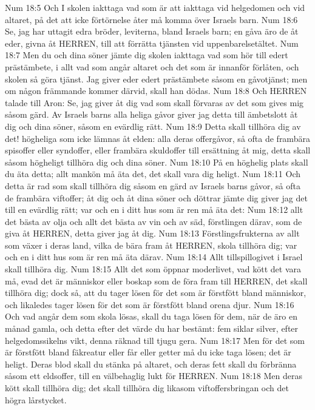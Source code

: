 Num 18:5  Och I skolen iakttaga vad som är att iakttaga vid helgedomen och vid altaret, på det att icke förtörnelse åter må komma över Israels barn.
Num 18:6  Se, jag har uttagit edra bröder, leviterna, bland Israels barn; en gåva äro de åt eder, givna åt HERREN, till att förrätta tjänsten vid uppenbarelsetältet.
Num 18:7  Men du och dina söner jämte dig skolen iakttaga vad som hör till edert prästämbete, i allt vad som angår altaret och det som är innanför förlåten, och skolen så göra tjänst. Jag giver eder edert prästämbete såsom en gåvotjänst; men om någon främmande kommer därvid, skall han dödas.
Num 18:8  Och HERREN talade till Aron: Se, jag giver åt dig vad som skall förvaras av det som gives mig såsom gärd. Av Israels barns alla heliga gåvor giver jag detta till ämbetslott åt dig och dina söner, såsom en evärdlig rätt.
Num 18:9  Detta skall tillhöra dig av det! högheliga som icke lämnas åt elden: alla deras offergåvor, så ofta de frambära spisoffer eller syndoffer, eller frambära skuldoffer till ersättning åt mig, detta skall såsom högheligt tillhöra dig och dina söner.
Num 18:10  På en höghelig plats skall du äta detta; allt mankön må äta det, det skall vara dig heligt.
Num 18:11  Och detta är rad som skall tillhöra dig såsom en gärd av Israels barns gåvor, så ofta de frambära viftoffer; åt dig och åt dina söner och döttrar jämte dig giver jag det till en evärdlig rätt; var och en i ditt hus som är ren må äta det:
Num 18:12  allt det bästa av olja och allt det bästa av vin och av säd, förstlingen därav, som de giva åt HERREN, detta giver jag åt dig.
Num 18:13  Förstlingsfrukterna av allt som växer i deras land, vilka de bära fram åt HERREN, skola tillhöra dig; var och en i ditt hus som är ren må äta därav.
Num 18:14  Allt tillspillogivet i Israel skall tillhöra dig.
Num 18:15  Allt det som öppnar moderlivet, vad kött det vara må, evad det är människor eller boskap som de föra fram till HERREN, det skall tillhöra dig; dock så, att du tager lösen för det som är förstfött bland människor, och likaledes tager lösen för det som är förstfött bland orena djur.
Num 18:16  Och vad angår dem som skola lösas, skall du taga lösen för dem, när de äro en månad gamla, och detta efter det värde du har bestämt: fem siklar silver, efter helgedomssikelns vikt, denna räknad till tjugu gera.
Num 18:17  Men för det som är förstfött bland fäkreatur eller får eller getter må du icke taga lösen; det är heligt. Deras blod skall du stänka på altaret, och deras fett skall du förbränna såsom ett eldsoffer, till en välbehaglig lukt för HERREN.
Num 18:18  Men deras kött skall tillhöra dig; det skall tillhöra dig likasom viftoffersbringan och det högra lårstycket.
